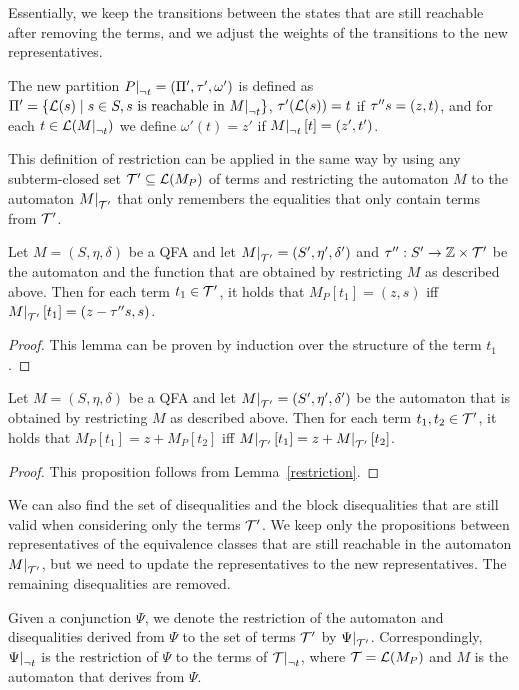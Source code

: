 Essentially, we keep the transitions between the states that are still reachable after removing the terms, and we adjust the weights of the transitions to the new representatives.

The new partition $\restr{P}{\neg t} = (\Pi', \tau', \omega')$ is defined as $\Pi' = \{\L(s) \mid s \in S, s \text{ is reachable in $\restr{M}{\neg t}$}\}$,
$\tau' (\mathcal{L}(s)) = t$ if $\tau'' s = (z, t)$, and
for each $t \in \L(\restr{M}{\neg t})$ we define $\omega'(t) = z'$ if $\restr{M}{\neg t}[t] = (z', t')$.

This definition of restriction can be applied in the same way by using any subterm-closed set $\mathcal{T}' \subseteq \mathcal{L}(M_P)$ of terms and restricting the automaton $M$ to the automaton $\restr{M}{\T'}$ that only remembers the equalities that only contain terms from $\mathcal{T}'$.

\begin{lemma}\label{restriction}
    Let $M = (S, \eta, \delta)$ be a QFA and let $\restr{M}{\T'} = (S', \eta', \delta')$ and $\tau'' : S' \rightarrow \mathbb{Z} \times \mathcal{T}'$ be the automaton and the function that are obtained by restricting $M$ as described above.
    Then for each term $t_1 \in \mathcal{T}'$, it holds that $M_P[t_1] = (z, s)$ iff $\restr{M}{\T'}[t_1] = (z - \repr s, s)$.
\end{lemma}
\begin{proof}
    This lemma can be proven by induction over the structure of the term $t_1$.
\end{proof}

\begin{proposition}
    Let $M = (S, \eta, \delta)$ be a QFA and let $\restr{M}{\T'} = (S', \eta', \delta')$ be the automaton that is obtained by restricting $M$ as described above.
    Then for each term $t_1, t_2 \in \mathcal{T}'$, it holds that $M_P[t_1] = z + M_P[t_2]$ iff $\restr{M}{\T'}[t_1] = z + \restr{M}{\T'}[t_2]$.
\end{proposition}
\begin{proof}
    This proposition follows from Lemma~\ref{restriction}.
\end{proof}

We can also find the set of disequalities and the block disequalities that are still valid when considering only the terms $\mathcal{T}'$.
We keep only the propositions between representatives of the equivalence classes that are still reachable in the automaton $\restr{M}{\T'}$, but we need to update the representatives to the new representatives.
The remaining disequalities are removed.

Given a conjunction $\Psi$, we denote the restriction of the automaton and disequalities derived from $\Psi$ to the set of terms $\mathcal{T}'$ by $\restr{\Psi}{\T'}$.
Correspondingly, $\restr{\Psi}{\neg t}$ is the restriction of $\Psi$ to the terms of $\restr{\T}{\neg t}$, where $\mathcal{T} = \mathcal{L}(M_P)$ and $M$ is the automaton that derives from $\Psi$.
